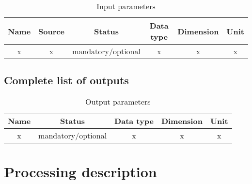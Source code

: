 \documentclass[a4paper, oneside, 11pt, article, english]{memoir}
\begin{document}
\begin{table}[htbp]
  \centering
  \caption{Input parameters}
  \label{tab:input}
  \begin{tabular}{cccccc}
    \toprule
    Name & Source & Status & Data type & Dimension & Unit \\
    \midrule
    x & x & mandatory/optional & x & x & x \\
    \bottomrule
  \end{tabular}
\end{table}


\section{Complete list of outputs}
\label{sec:output}

\iffalse
{
  \itshape
  A comprehensive list of outputs must be provided in the table. For each output,
  the following information is needed

  \begin{description}
    \firmlist
  \item[Name] the name must follow the nomenclature as defined by WP120 Data
    Products Definition Document [RD3].
  \item[Status] specify if this data is \emph{mandatory} or \emph{optional} to run the algorithm.
  \item[Data type] see \cref{sec:nomenclature} for the standard definitions
  \item[Dimension] specify the dimension of the data (e.g; the dimension of a scalar is 0, of an array 1, etc).
  \item[Unit] provide the unit of the data and the data-system of units (cgs or mks).
  \end{description}
}
\fi

\begin{table}[htbp]
  \centering
  \caption{Output parameters}
  \label{tab:output}
  \begin{tabular}{ccccc}
    \toprule
    Name & Status & Data type & Dimension & Unit \\
    \midrule
    x & mandatory/optional & x & x & x \\
    \bottomrule
  \end{tabular}
\end{table}


\clearpage
\chapter{Processing description}
\label{chap:processing}
\end{document}
